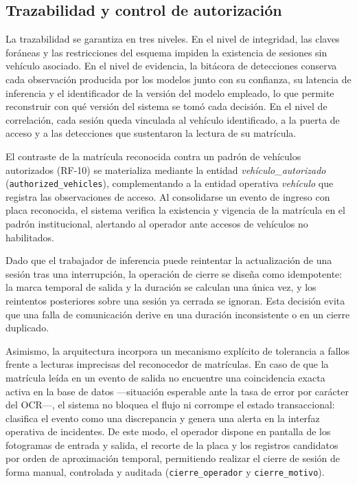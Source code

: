 \subsection{Trazabilidad y control de autorización}

La trazabilidad se garantiza en tres niveles. En el nivel de integridad, las
claves foráneas y las restricciones del esquema impiden la existencia de
sesiones sin vehículo asociado. En el nivel de evidencia, la bitácora de
detecciones conserva cada observación producida por los modelos junto con su
confianza, su latencia de inferencia y el identificador de la versión del modelo
empleado, lo que permite reconstruir con qué versión del sistema se tomó cada
decisión. En el nivel de correlación, cada sesión queda vinculada al vehículo
identificado, a la puerta de acceso y a las detecciones que sustentaron la
lectura de su matrícula.

El contraste de la matrícula reconocida contra un padrón de vehículos
autorizados (RF-10) se materializa mediante la entidad
\textit{vehículo\_autorizado} (\texttt{authorized\_vehicles}), complementando a la
entidad operativa \textit{vehículo} que registra las observaciones de acceso.
Al consolidarse un evento de ingreso con placa reconocida, el sistema verifica
la existencia y vigencia de la matrícula en el padrón institucional, alertando al
operador ante accesos de vehículos no habilitados.

Dado que el trabajador de inferencia puede reintentar la actualización de una
sesión tras una interrupción, la operación de cierre se diseña como idempotente:
la marca temporal de salida y la duración se calculan una única vez, y los
reintentos posteriores sobre una sesión ya cerrada se ignoran. Esta decisión
evita que una falla de comunicación derive en una duración inconsistente o en un
cierre duplicado.

Asimismo, la arquitectura incorpora un mecanismo explícito de tolerancia a fallos
frente a lecturas imprecisas del reconocedor de matrículas. En caso de que la
matrícula leída en un evento de salida no encuentre una coincidencia exacta
activa en la base de datos ---situación esperable ante la tasa de error por
carácter del OCR---, el sistema no bloquea el flujo ni corrompe el estado
transaccional: clasifica el evento como una discrepancia y genera una alerta en la
interfaz operativa de incidentes. De este modo, el operador dispone en pantalla de
los fotogramas de entrada y salida, el recorte de la placa y los registros
candidatos por orden de aproximación temporal, permitiendo realizar el cierre de
sesión de forma manual, controlada y auditada (\texttt{cierre\_operador} y
\texttt{cierre\_motivo}).
